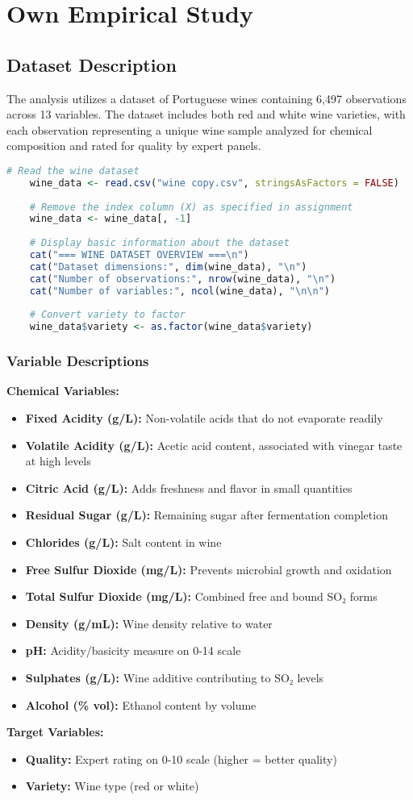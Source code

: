 \chapter{Own Empirical Study}

\section{Dataset Description}

The analysis utilizes a dataset of Portuguese wines containing 6,497 observations across 13 variables. The dataset includes both red and white wine varieties, with each observation representing a unique wine sample analyzed for chemical composition and rated for quality by expert panels.

\begin{lstlisting}[language=R, caption=Data Import and Initial Setup]
	# Read the wine dataset
	wine_data <- read.csv("wine copy.csv", stringsAsFactors = FALSE)
	
	# Remove the index column (X) as specified in assignment
	wine_data <- wine_data[, -1]
	
	# Display basic information about the dataset
	cat("=== WINE DATASET OVERVIEW ===\n")
	cat("Dataset dimensions:", dim(wine_data), "\n")
	cat("Number of observations:", nrow(wine_data), "\n")
	cat("Number of variables:", ncol(wine_data), "\n\n")
	
	# Convert variety to factor
	wine_data$variety <- as.factor(wine_data$variety)
\end{lstlisting}

\subsection{Variable Descriptions}

\textbf{Chemical Variables:}
\begin{itemize}
	\item \textbf{Fixed Acidity (g/L):} Non-volatile acids that do not evaporate readily
	\item \textbf{Volatile Acidity (g/L):} Acetic acid content, associated with vinegar taste at high levels
	\item \textbf{Citric Acid (g/L):} Adds freshness and flavor in small quantities
	\item \textbf{Residual Sugar (g/L):} Remaining sugar after fermentation completion
	\item \textbf{Chlorides (g/L):} Salt content in wine
	\item \textbf{Free Sulfur Dioxide (mg/L):} Prevents microbial growth and oxidation
	\item \textbf{Total Sulfur Dioxide (mg/L):} Combined free and bound SO₂ forms
	\item \textbf{Density (g/mL):} Wine density relative to water
	\item \textbf{pH:} Acidity/basicity measure on 0-14 scale
	\item \textbf{Sulphates (g/L):} Wine additive contributing to SO₂ levels
	\item \textbf{Alcohol (\% vol):} Ethanol content by volume
\end{itemize}

\textbf{Target Variables:}
\begin{itemize}
	\item \textbf{Quality:} Expert rating on 0-10 scale (higher = better quality)
	\item \textbf{Variety:} Wine type (red or white)
\end{itemize}